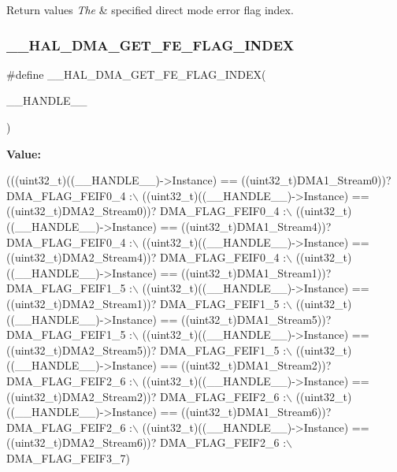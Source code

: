 \begin{DoxyRetVals}{Return values}
{\em The} & specified direct mode error flag index. \\
\hline
\end{DoxyRetVals}
\mbox{\label{group___d_m_a_ga5878c3a1dbcf01e6840fffcf1f244088}} 
\subsubsection{\texorpdfstring{\+\_\+\+\_\+\+H\+A\+L\+\_\+\+D\+M\+A\+\_\+\+G\+E\+T\+\_\+\+F\+E\+\_\+\+F\+L\+A\+G\+\_\+\+I\+N\+D\+EX}{\_\_HAL\_DMA\_GET\_FE\_FLAG\_INDEX}}
{\footnotesize\ttfamily \#define \+\_\+\+\_\+\+H\+A\+L\+\_\+\+D\+M\+A\+\_\+\+G\+E\+T\+\_\+\+F\+E\+\_\+\+F\+L\+A\+G\+\_\+\+I\+N\+D\+EX(\begin{DoxyParamCaption}\item[{}]{\+\_\+\+\_\+\+H\+A\+N\+D\+L\+E\+\_\+\+\_\+ }\end{DoxyParamCaption})}

{\bfseries Value\+:}
\begin{DoxyCode}
(((uint32\_t)((\_\_HANDLE\_\_)->Instance) == ((uint32\_t)DMA1\_Stream0))? DMA\_FLAG\_FEIF0\_4 :\(\backslash\)
 ((uint32\_t)((\_\_HANDLE\_\_)->Instance) == ((uint32\_t)DMA2\_Stream0))? DMA\_FLAG\_FEIF0\_4 :\(\backslash\)
 ((uint32\_t)((\_\_HANDLE\_\_)->Instance) == ((uint32\_t)DMA1\_Stream4))? DMA\_FLAG\_FEIF0\_4 :\(\backslash\)
 ((uint32\_t)((\_\_HANDLE\_\_)->Instance) == ((uint32\_t)DMA2\_Stream4))? DMA\_FLAG\_FEIF0\_4 :\(\backslash\)
 ((uint32\_t)((\_\_HANDLE\_\_)->Instance) == ((uint32\_t)DMA1\_Stream1))? DMA\_FLAG\_FEIF1\_5 :\(\backslash\)
 ((uint32\_t)((\_\_HANDLE\_\_)->Instance) == ((uint32\_t)DMA2\_Stream1))? DMA\_FLAG\_FEIF1\_5 :\(\backslash\)
 ((uint32\_t)((\_\_HANDLE\_\_)->Instance) == ((uint32\_t)DMA1\_Stream5))? DMA\_FLAG\_FEIF1\_5 :\(\backslash\)
 ((uint32\_t)((\_\_HANDLE\_\_)->Instance) == ((uint32\_t)DMA2\_Stream5))? DMA\_FLAG\_FEIF1\_5 :\(\backslash\)
 ((uint32\_t)((\_\_HANDLE\_\_)->Instance) == ((uint32\_t)DMA1\_Stream2))? DMA\_FLAG\_FEIF2\_6 :\(\backslash\)
 ((uint32\_t)((\_\_HANDLE\_\_)->Instance) == ((uint32\_t)DMA2\_Stream2))? DMA\_FLAG\_FEIF2\_6 :\(\backslash\)
 ((uint32\_t)((\_\_HANDLE\_\_)->Instance) == ((uint32\_t)DMA1\_Stream6))? DMA\_FLAG\_FEIF2\_6 :\(\backslash\)
 ((uint32\_t)((\_\_HANDLE\_\_)->Instance) == ((uint32\_t)DMA2\_Stream6))? DMA\_FLAG\_FEIF2\_6 :\(\backslash\)
   DMA\_FLAG\_FEIF3\_7)
\end{DoxyCode}


